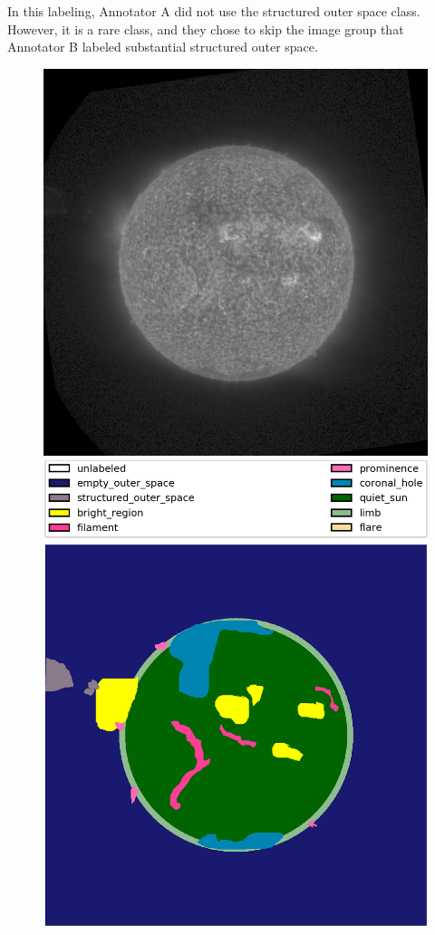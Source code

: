 \documentclass[twoside]{report}
\begin{document}
In this labeling, Annotator A did not use the structured outer space class. However, it is a rare class, and they chose to skip the image group that Annotator B labeled substantial structured outer space. 
\begin{figure}[ht]
  \begin{center}
    \includegraphics[scale=0.45]{g20170619060208}
    \includegraphics[scale=0.125]{g20170619060208-0b}

\end{center}
\end{figure}
\end{document}
